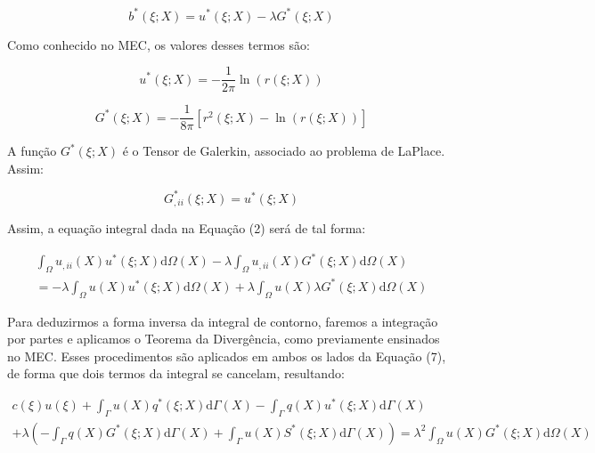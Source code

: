 \documentclass[a4paper,12p]{article}
\newcommand{\dd}[1]{\mathrm{d}#1}
\begin{document}
	\begin{equation}
	b^{*}(\xi;X) = u^{*}(\xi;X) - \lambda G^{*}(\xi;X)
	\end{equation}
	
	Como conhecido no MEC, os valores desses termos são:
	
	\begin{equation}
	u^{*}(\xi;X) = -\frac{1}{2\pi} \ln(r(\xi;X))
	\end{equation}
	
	\begin{equation}
	G^{*}(\xi;X) = -\frac{1}{8\pi} [r^{2}(\xi;X)-\ln(r(\xi;X))]
	\end{equation}
	
	A função $G^{*}(\xi;X)$ é o Tensor de Galerkin, associado ao problema de LaPlace. Assim:
	
	\begin{equation}
	G^{*}_{,ii}(\xi;X) = u^{*}(\xi;X)
	\end{equation}
	
	Assim, a equação integral dada na Equação (2) será de tal forma:
	
	\begin{equation}
	\begin{gathered}
	\int_{\Omega}^{} u_{,ii}(X) u^{*}(\xi;X) \dd{\Omega(X)} 
	-\lambda \int_{\Omega}^{} u_{,ii}(X) G^{*}(\xi;X) \dd{\Omega(X)}
	\\
	=-\lambda \int_{\Omega}^{} u(X) u^{*}(\xi;X) \dd{\Omega(X)}
	+\lambda \int_{\Omega}^{} u(X) \lambda G^{*}(\xi;X) \dd{\Omega(X)}
	\end{gathered}
	\end{equation}
	
	Para deduzirmos a forma inversa da integral de contorno, faremos a integração por partes e aplicamos o Teorema da Divergência, como previamente ensinados no MEC. Esses procedimentos são aplicados em ambos os lados da Equação (7), de forma que dois termos da integral se cancelam, resultando:
	
	\begin{equation}
	\begin{gathered}
	c(\xi)u(\xi)
	+        \int_{\Gamma}^{} u(X) q^{*}(\xi;X) \dd{\Gamma(X)} 
	-		 \int_{\Gamma}^{} q(X) u^{*}(\xi;X) \dd{\Gamma(X)}
	\\
	+\lambda (
	-\int_{\Gamma}^{} q(X) G^{*}(\xi;X) \dd{\Gamma(X)}
	+\int_{\Gamma}^{} u(X) S^{*}(\xi;X) \dd{\Gamma(X)}
	)
	=
	\lambda^{2} \int_{\Omega}^{} u(X) G^{*}(\xi;X) \dd{\Omega(X)}
	\end{gathered}
	\end{equation}
	
\end{document}

